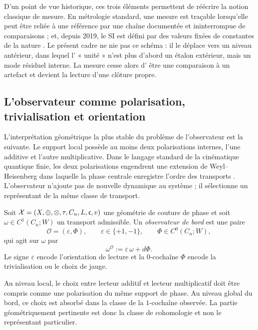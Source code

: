 D'un point de vue historique, ces trois éléments permettent de réécrire la notion classique de
mesure. En métrologie standard, une mesure est traçable lorsqu'elle peut être reliée à une référence
par une chaîne documentée et ininterrompue de comparaisons ; et, depuis 2019, le SI est défini
par des valeurs fixées de constantes de la nature \cite{NISTTraceability2023,BIPMSI2019}.
Le présent cadre ne nie pas ce schéma : il le déplace vers un niveau antérieur, dans lequel l'
« unité » n'est plus d'abord un étalon extérieur, mais un mode résiduel interne. La mesure cesse alors d'
être une comparaison à un artefact et devient la lecture d'une clôture propre.

\subsection{L'observateur comme polarisation, trivialisation et orientation}

L'interprétation géométrique la plus stable du problème de l'observateur est la suivante. Le support
local possède au moins deux polarisations internes, l'une additive et l'autre multiplicative. Dans le langage
standard de la cinématique quantique finie, les deux polarisations engendrent une extension de
Weyl--Heisenberg dans laquelle la phase centrale enregistre l'ordre des transports
\cite{Tolar2014,Vourdas2006}. L'observateur n'ajoute pas de nouvelle dynamique au système ; il sélectionne un
représentant de la même classe de transport.

\begin{definition}
Soit $\mathcal X=(X,\oplus,\otimes,\tau,C_n,L,\mathfrak c,v)$ une géométrie de couture de phase et soit
$\omega\in C^1(C_n;W)$ un transport admissible. Un \emph{observateur de bord} est une paire
\[
\mathcal O=(\varepsilon,\Phi),
\qquad
\varepsilon\in\{+1,-1\},
\qquad
\Phi\in C^0(C_n;W),
\]
qui agit sur $\omega$ par
\[
\omega^{\mathcal O}:=\varepsilon\,\omega+d\Phi.
\]
Le signe $\varepsilon$ encode l'orientation de lecture et la $0$-cochaîne $\Phi$ encode la
trivialisation ou le choix de jauge.
\end{definition}

\begin{remark}
Au niveau local, le choix entre lecteur additif et lecteur multiplicatif doit être compris comme une
polarisation du même support de phase. Au niveau global du bord, ce choix est absorbé dans
la classe de la $1$-cochaîne observée. La partie géométriquement pertinente est donc la classe de
cohomologie et non le représentant particulier.
\end{remark}

